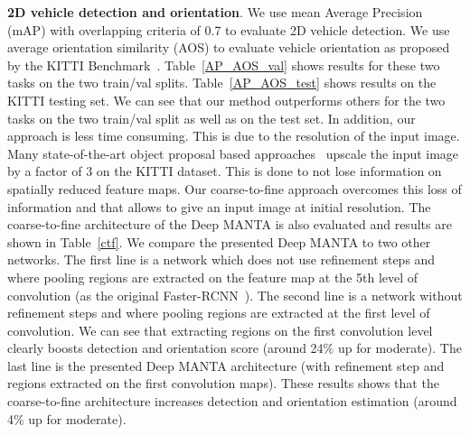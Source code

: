 \documentclass[10pt,twocolumn,letterpaper]{article}
\begin{document}
\textbf{2D vehicle detection and orientation}. We use mean Average Precision (mAP) with overlapping criteria of 0.7 to evaluate 2D vehicle detection. We use average orientation similarity (AOS) to evaluate vehicle orientation as proposed by the KITTI Benchmark~\cite{kitti}. Table~\ref{AP_AOS_val} shows results for these two tasks on the two train/val splits. Table~\ref{AP_AOS_test} shows results on the KITTI testing set. We can see that our method outperforms others for the two tasks on the two train/val split as well as on the test set. In addition, our approach is less time consuming. This is due to the resolution of the input image. Many state-of-the-art object proposal based approaches~\cite{subcnn,mono3d, 3dop} upscale the input image by a factor of 3 on the KITTI dataset. This is done to not lose information on spatially reduced feature maps. Our coarse-to-fine approach overcomes this loss of information and that allows to give an input image at initial resolution.  The coarse-to-fine architecture of the Deep MANTA is also evaluated and results are shown in Table~\ref{ctf}. We compare the presented Deep MANTA to two other networks. The first line is a network which does not use refinement steps and where pooling regions are extracted on the feature map at the 5th level of convolution (as the original Faster-RCNN~\cite{faster}). The second line is a network without refinement steps and where pooling regions are extracted at the first level of convolution. We can see that extracting regions on the first convolution level clearly boosts detection and orientation score (around 24\% up for moderate). The last line is the presented Deep MANTA architecture (with refinement step and regions extracted on the first convolution maps). These results shows that the coarse-to-fine architecture increases detection and orientation estimation (around 4\% up for moderate).
\end{document}
